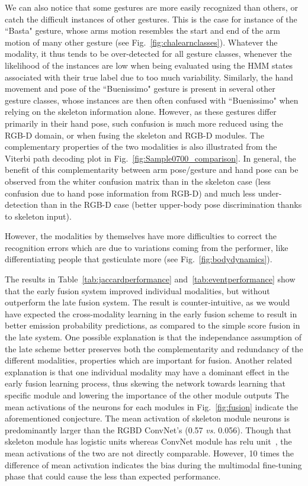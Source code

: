 We can also notice that some gestures are more easily recognized than others,
or catch the difficult instances of other gestures.
This is the case for instance of the ``Basta" gesture,
whose arms motion  resembles the  start and end of the arm motion of many other gesture (see Fig.~\ref{fig:chalearnclasses}).
Whatever the modality, it thus tends to be over-detected for all gesture classes, whenever the
likelihood of the instances are low when being evaluated using the HMM states associated with their true label
due to too much variability.
%
Similarly, the hand movement and pose of the ``Buenissimo" gesture is present in several other gesture classes,
whose instances are then often confused with ``Buenissimo" when relying on the skeleton information alone.
%
However, as these gestures differ primarily in their hand pose, such confusion is much more reduced using the RGB-D domain,
or when fusing  the skeleton and RGB-D modules.
%
The complementary properties of the two modalities is also illustrated from the Viterbi path decoding plot in Fig.~\ref{fig:Sample0700_comparison}.
In general, the benefit of this complementarity between arm pose/gesture and hand pose
can be observed from the whiter confusion matrix than in the skeleton case (less confusion due to hand pose information from RGB-D)
and much less under-detection than in the RGB-D case (better upper-body pose discrimination thanks to skeleton input).
%

However, the modalities by themselves have more difficulties to correct the recognition errors which are due to variations coming from the performer,
like differentiating  people that gesticulate more (see Fig.~\ref{fig:bodydynamics}).

%
The results in Table~\ref{tab:jaccardperformance} and~\ref{tab:eventperformance} show that the early fusion system 
improved individual modalities, but without outperform the late fusion system. 
%
The result is counter-intuitive, as we would have expected the cross-modality learning in the early fusion scheme 
to result in better emission probability predictions, as compared to the simple score fusion in the late system.
%
One possible explanation is that the independance assumption of the late scheme better preserves both
the complementarity and redundancy of the different modalities, properties which are important for fusion.
%
Another related explanation is that one individual modality may have a dominant effect in the early fusion learning process, 
thus skewing the network towards learning that specific module and lowering the importance of the other module outputs 
%
The mean activations of the neurons for each modules in Fig.~\ref{fig:fusion} indicate the aforementioned conjecture.
 The mean activation of skeleton module neurons is predominantly larger than the RGBD ConvNet's (0.57 \emph{vs.} 0.056). Though that skeleton module has logistic units whereas ConvNet module has relu unit~\cite{DBLP:journals/corr/PigouODHD15}, the mean activations of the two are not directly comparable. However, 10 times the difference of mean activation indicates the bias during the multimodal fine-tuning phase that could cause the less than expected performance.

